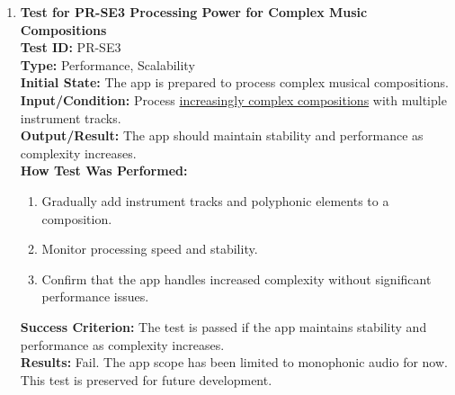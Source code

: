 \documentclass[12pt, titlepage]{article}
\begin{document}
\begin{enumerate}
    \item \textbf{Test for PR-SE3 Processing Power for Complex Music Compositions} \\
      \newline
      \textbf{Test ID:} PR-SE3 \\
      \textbf{Type:} Performance, Scalability \\
      \textbf{Initial State:} The app is prepared to process complex musical compositions. \\
      \textbf{Input/Condition:} Process 
      \href{https://github.com/emilyperica/ScoreGen/tree/main/test/TestingDatasets/piano-samples/sample-chords}{increasingly complex compositions} with multiple instrument tracks. \\
      \textbf{Output/Result:} The app should maintain stability and performance as complexity increases. \\
      \textbf{How Test Was Performed:}
      \begin{enumerate}
          \item Gradually add instrument tracks and polyphonic elements to a composition.
          \item Monitor processing speed and stability.
          \item Confirm that the app handles increased complexity without significant performance issues.
      \end{enumerate}
      \textbf{Success Criterion:} The test is passed if the app maintains stability and performance as complexity increases.\\
      \textbf{Results:} Fail. The app scope has been limited to monophonic audio for now. This test is preserved for future development.\\


\end{enumerate}
\end{document}
